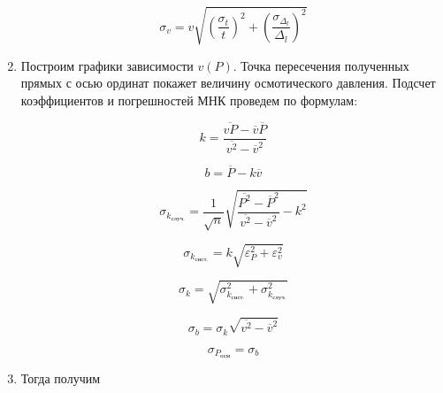\documentclass[a4paper, 12pt]{article}%
\begin{document}
\begin{enumerate}
	\begin{equation}
 \sigma_v = v \sqrt{\left(\frac{\sigma_t}{t}\right)^2 + \left(\frac{\sigma_{\Delta_l}}{\Delta_l}\right)^2 } 
\end{equation}

	
	\item Построим графики зависимости $ v(P) $. Точка пересечения полученных прямых с осью ординат покажет величину осмотического давления. Подсчет коэффициентов и погрешностей МНК проведем по формулам: 
	
\begin{equation}
	 k = \frac{\overline{vP} - \overline v  \overline P}{\overline{v^2} - \overline v ^2} 
\end{equation}
	
	\begin{equation}
		 b = \overline P - k \overline v 
	\end{equation}
	
	\begin{equation}
		 \sigma_{k_{\text{случ.}}} = \frac{1}{\sqrt n} \sqrt{\frac{\overline{P^2} - \overline P ^2}{\overline{v^2} - \overline v ^2} - k^2} 
	\end{equation}
		
	\begin{equation}
		\sigma_{k_{\text{сист.}}} = k \sqrt{\varepsilon_P^2 + \varepsilon_v^2}
	\end{equation}

	\begin{equation}
		\sigma_k = \sqrt{\sigma_{k_{\text{сист.}}}^2 + \sigma_{k_{\text{случ.}}}^2}
	\end{equation}

	\begin{equation}
		 \sigma_b = \sigma_k \sqrt{\overline{v^2} - \overline v ^2} 
	\end{equation}

	
	\begin{equation} 
		\sigma_{P_{\text{осм}}} = \sigma_b
	\end{equation}
	
	\item Тогда получим 
	

\end{enumerate}
\end{document}
